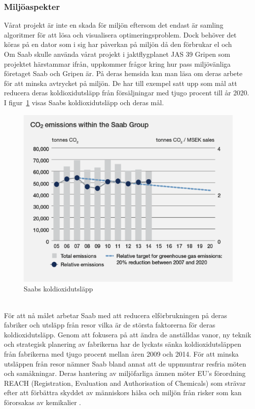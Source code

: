 \subsubsection{Miljöaspekter}
Vårat projekt är inte en skada för miljön eftersom det endast är samling algoritmer för att lösa och visualisera optimeringsproblem. Dock behöver det köras på en dator som i sig har påverkan på miljön då den förbrukar el och 
\\
Om Saab skulle använda vårat projekt i jaktflygplanet JAS 39 Gripen som projektet härstammar ifrån, uppkommer frågor kring hur pass miljövänliga företaget Saab och Gripen är. På deras hemsida \citep{saabimpact} kan man läsa om deras arbete för att minska avtrycket på miljön. De har till exempel satt upp som mål att reducera deras koldioxidutsläpp från försäljningar med tjugo procent till år 2020. I figur~\ref{fig:saabkoldioxid} visas Saabs koldioxidutsläpp och deras mål.   
\leavevmode
\begin{figure}[h]
	\centering
	\includegraphics[scale=1.5]{grafik/saabemissions.png}
	\caption{Saabs koldioxidutsläpp}\label{fig:saabkoldioxid}	
\end{figure} 
\\
För att nå målet arbetar Saab med att reducera elförbrukningen på deras fabriker och utsläpp från resor vilka är de största faktorerna för deras koldioxidutsläpp. Genom att fokusera på att ändra de anställdas vanor, ny teknik och strategisk planering av fabrikerna har de lyckats sänka koldioxidutsläppen från fabrikerna med tjugo procent mellan åren 2009 och 2014. För att minska utsläppen från resor nämner Saab bland annat att de uppmuntrar resfria möten och samåkningar. Deras hantering av miljöfarliga ämnen möter EU's förordning REACH (Registration, Evaluation and Authorisation of Chemicals) som strävar efter att förbättra skyddet av människors hälsa och miljön från risker som kan förorsakas av kemikalier \citep{reach}. 

